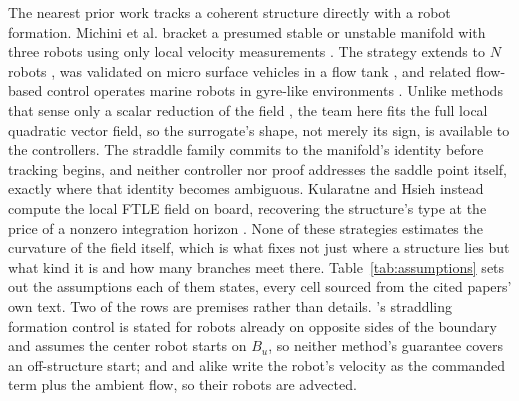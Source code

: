 \documentclass[lettersize,journal]{IEEEtran}
\begin{document}
The nearest prior work tracks a coherent structure directly with a
robot formation. Michini et al. bracket a presumed stable or unstable
manifold with three robots using only local velocity measurements
\cite{17}. The strategy extends to $N$ robots \cite{18}, was validated
on micro surface vehicles in a flow tank \cite{19}, and related
flow-based control operates marine robots in gyre-like environments
\cite{20}. Unlike methods that sense only a scalar reduction of the
field \cite{33}, the team here fits the full local quadratic vector
field, so the surrogate's shape, not merely its sign, is available to
the controllers. The straddle family commits to the manifold's identity
before tracking begins, and neither controller nor proof addresses the
saddle point itself, exactly where that identity becomes ambiguous.
Kularatne and Hsieh instead compute the local FTLE field on board,
recovering the structure's type at the price of a nonzero integration
horizon \cite{21}. None of these strategies estimates the curvature of
the field itself, which is what fixes not just where a structure lies
but what kind it is and how many branches meet there.
Table~\ref{tab:assumptions} sets out the assumptions each of them
states, every cell sourced from the cited papers' own text. Two of the
rows are premises rather than details. \cite{17}'s straddling formation
control is stated for robots already on opposite sides of the boundary
and \cite{21} assumes the center robot starts on $B_u$, so neither
method's guarantee covers an off-structure start; and \cite{17,18,19,20}
and \cite{21} alike write the robot's velocity as the commanded term
plus the ambient flow, so their robots are advected.
\end{document}
